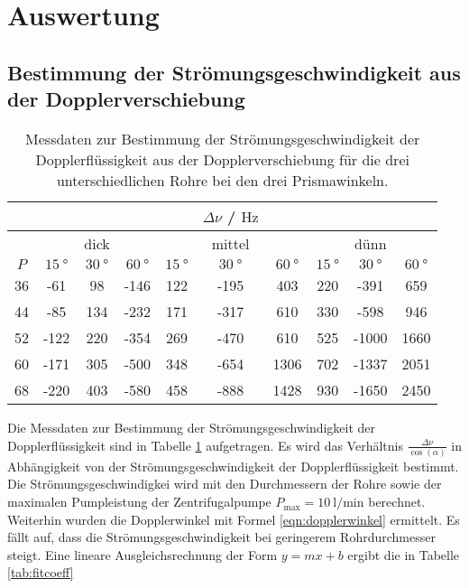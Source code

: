 \section{Auswertung}
\label{sec:Auswertung}
\subsection{Bestimmung der Strömungsgeschwindigkeit aus der Dopplerverschiebung}
\begin{table}
	\centering
	\caption{Messdaten zur Bestimmung der Strömungsgeschwindigkeit der Dopplerflüssigkeit aus der Dopplerverschiebung für die drei unterschiedlichen Rohre bei den drei Prismawinkeln.}
	\label{tab:aufgabeA}
	\begin{tabular}{cccccccccc}
		\toprule
		& & & & & $\Delta \nu$ / $\si{\hertz}$ & & & & \\
		\midrule
		& & dick & & & mittel & & & dünn & \\
		\midrule
		$P$ & $\SI{15}{\degree}$ & $\SI{30}{\degree}$ & $\SI{60}{\degree}$ & $\SI{15}{\degree}$ & $\SI{30}{\degree}$ & $\SI{60}{\degree}$ & $\SI{15}{\degree}$ & $\SI{30}{\degree}$ & $\SI{60}{\degree}$ \\
		\midrule
		36 & -61 & 98 & -146 & 122 & -195 & 403 & 220 & -391 & 659 \\
		44 & -85 & 134 & -232 & 171 & -317 & 610 & 330 & -598 & 946 \\
		52 & -122 & 220 & -354 & 269 & -470 & 610 & 525 & -1000 & 1660 \\
		60 & -171 & 305 & -500 & 348 & -654 & 1306 & 702 & -1337 & 2051 \\
		68 & -220 & 403 & -580 & 458 & -888 & 1428 & 930 & -1650 & 2450 \\
		\bottomrule
	\end{tabular}
\end{table}
Die Messdaten zur Bestimmung der Strömungsgeschwindigkeit der Dopplerflüssigkeit sind
in Tabelle \ref{tab:aufgabeA} aufgetragen.
Es wird das Verhältnis $\frac{\Delta \nu}{\cos(\alpha)}$ in Abhängigkeit von der
Strömungsgeschwindigkeit der Dopplerflüssigkeit bestimmt. Die Strömungsgeschwindigkei
wird mit den Durchmessern der Rohre sowie der maximalen Pumpleistung der Zentrifugalpumpe 
$P_{\mathrm{max}} = \SI{10}{\litre\per\minute}$ berechnet. Weiterhin wurden die
Dopplerwinkel mit Formel \eqref{eqn:dopplerwinkel} ermittelt.
Es fällt auf, dass die Strömungsgeschwindigkeit bei geringerem Rohrdurchmesser steigt.
Eine lineare Ausgleichsrechnung der Form $y=mx+b$ ergibt die in Tabelle \ref{tab:fitcoeff}
